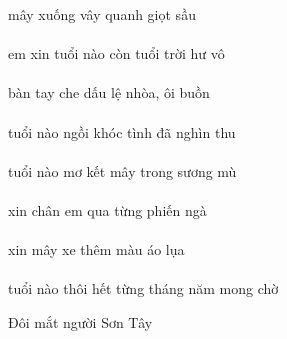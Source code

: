 \documentclass[14pt,a4paper]{extarticle}
\begin{document}
mây xuống vây quanh giọt sầu\\[1ex]
{\Huge {}   \quanh {} }\\[1ex]
em xin tuổi nào còn tuổi trời hư vô\\[1ex]
{\Huge \em \xin {}      }\\[1ex]
bàn tay che dấu lệ  nhòa, ôi buồn\\[1ex]
{\Huge {} \che {}     }\\[1ex]
tuổi nào ngồi khóc tình đã nghìn thu\\[1ex]
{\Huge {}       \thu}\\[1ex]
tuổi nào mơ kết mây trong sương mù\\[1ex]
{\Huge {}     \trong {} }\\[1ex]
xin chân em qua từng phiến ngà\\[1ex]
{\Huge \xin {} \em \qua {}  }\\[1ex]
xin mây xe thêm màu áo lụa\\[1ex]
{\Huge \xin {} \Xe {}   }\\[1ex]
tuổi nào thôi hết từng tháng năm mong chờ\\[1ex]
{\Huge {}       \mong {}}


\newpage

{\normalsize Đôi mắt người  Sơn Tây}
 
{\Huge {}     }
\bigskip 
 
\end{document}
